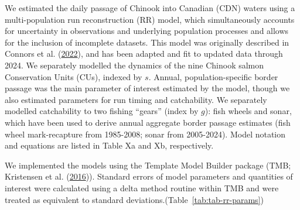 \documentclass[11pt]{book}
\begin{document}
\label{app:second-appendix}

We estimated the daily passage of Chinook into Canadian (CDN) waters using a multi-population run reconstruction (RR) model, which simultaneously accounts for uncertainty in observations and underlying population processes and allows for the inclusion of incomplete datasets. This model was originally described in Connors et al. (\protect\hyperlink{ref-connors2022}{2022}), and has been adapted and fit to updated data through 2024. We separately modelled the dynamics of the nine Chinook salmon Conservation Units (CUs), indexed by \(s\). Annual, population-specific border passage was the main parameter of interest estimated by the model, though we also estimated parameters for run timing and catchability. We separately modelled catchability to two fishing ``gears'' (index by \(g\)): fish wheels and sonar, which have been used to derive annual aggregate border passage estimates (fish wheel mark-recapture from 1985-2008; sonar from 2005-2024). Model notation and equations are listed in Table Xa and Xb, respectively.

We implemented the models using the Template Model Builder package (TMB; Kristensen et al. (\protect\hyperlink{ref-kristensen2016tmb}{2016})). Standard errors of model parameters and quantities of interest were calculated using a delta method routine within TMB and were treated as equivalent to standard deviations.(Table~\ref{tab:tab-rr-params})
\end{document}
